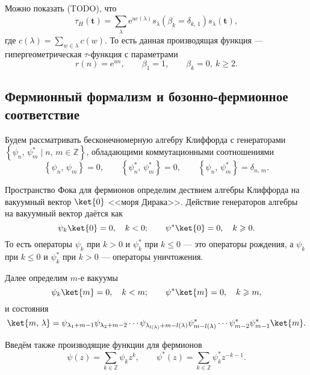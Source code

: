 \documentclass[a5paper,twoside]{extarticle}
\begin{document}
Можно показать (TODO), что
\begin{equation}
	\tau_H(\mathbf{t})=\sum_{\lambda}^{} \mathrm{e}^{u c(\lambda)}s_\lambda \left( \beta_k=\delta_{k,\,1} \right) 
	s_\lambda(\mathbf{t})
\label{eq:4}
,\end{equation} 
где $c(\lambda)= \sum_{w \in \lambda}^{} c(w)$. 
То есть данная производящая функция --- гипергеометрическая
$\tau$-функция с параметрами
\begin{equation}
	r(n)=\mathrm{e} ^{un},\qquad
	\beta_1=1,\qquad \beta_k=0,\ k\ge 2
.\end{equation} 
\subsection{Фермионный формализм и бозонно-фермионное соответствие}
Будем рассматривать бесконечномерную алгебру Клиффорда
с генераторами $\left\{ \psi_n,\,\psi^*_m \mid n,\,m \in \mathbb{Z} \right\} $, обладающими коммутационными соотношениями
\begin{equation}
\left\{ \psi_n,\,\psi_m \right\} =0,\qquad
\left\{ \psi_n^*,\,\psi^*_{m} \right\}=0,\qquad
\left\{ \psi_n,\,\psi_{m}^* \right\}=\delta_{n,\,m}
.\end{equation} 

Пространство Фока для фермионов определим дествием
алгебры Клиффорда на вакуумный вектор $\ket{0}$ <<моря Дирака>>. Действие генераторов алгебры на вакуумный вектор
даётся как
\begin{equation}
\psi_k\ket{0}=0,\quad k< 0;\qquad\psi^* \ket{0}=0,\quad
k\ge  0
.\end{equation} 
То есть операторы $\psi_k$ при $k>0$ и $\psi^*_k$ при
$k\le 0$ --- это операторы рождения, а $\psi_k$ при $k\le 0$ 
и $\psi_k^*$ при  $k> 0$ --- операторы уничтожения.

Далее определим $m$-е вакуумы
\begin{equation}
\psi_k\ket{m}=0,\quad k< m;\qquad\psi^* \ket{m}=0,\quad
k\ge  m
,\end{equation}
и состояния
\[
	\ket{m,\,\lambda}= \psi_{\lambda_1+m-1}\psi_{\lambda_2+m-2}\cdots\psi_{\lambda_{l(\lambda)}+m-l(\lambda)}\psi^*_{m-l(\lambda)}\cdots\psi^*_{m-2}\psi^*_{m-1}\ket{m}
.\] 

Введём также производящие функции для фермионов
\begin{equation}
\psi(z)=\sum _{k\in \mathbb{Z}}^{} \psi_k z^k,\qquad
\psi^* (z)=\sum_{k \in \mathbb{Z}}^{} \psi^*_k z^{-k-1}
.\end{equation} 
\end{document}
